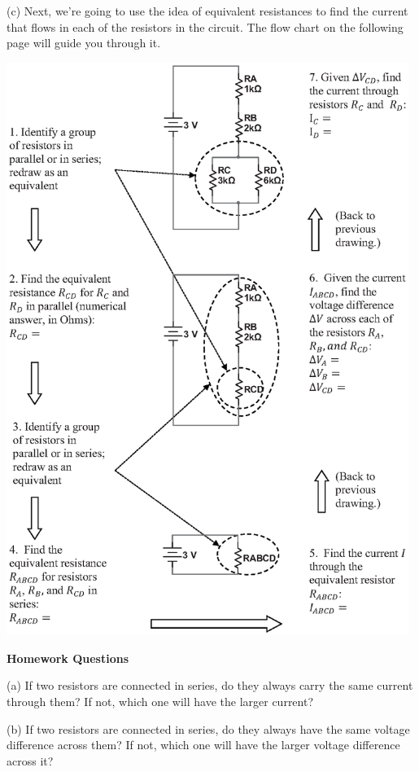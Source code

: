 (c) Next, we're going to use the idea of equivalent resistances to find the current that flows in each of the resistors in the circuit.  The flow chart on the following page will guide you through it.

\begin{center}
\includegraphics[width=0.98\textwidth]{electric_circuits2/step_by_step_circuit_bw.eps}
\vfill
\end{center}
\textbf{Homework Questions} \par
\nopagebreak
(a) If two resistors are connected in series, do they always carry the same current through them? If not, which one will have the larger current?
\vspace {0.7 in}

(b) If two resistors are connected in series, do they always have the same voltage difference across them?  If not, which one will have the larger voltage difference across it?
\vspace {0.7 in}

